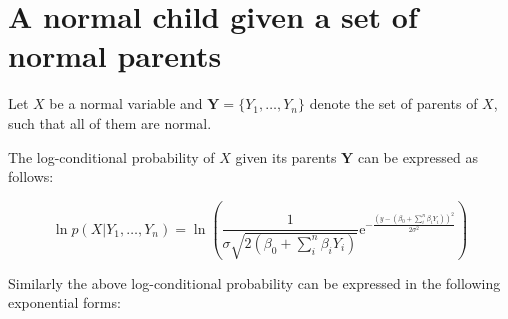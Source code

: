 \documentclass[11pt, oneside]{article}   	%
\newcommand{\me}{\mathrm{e}}
\numberwithin{figure}{section}
\numberwithin{equation}{section}
\numberwithin{table}{section}
\begin{document}
\newpage
\section{A normal child given a set of normal parents}

Let $X$ be a normal variable and $ \mathbf{Y} = \{Y_1,\ldots,Y_n\}$ denote the set of parents of $X$, such that all of them are normal. 

The log-conditional probability of $X$ given its parents $\mathbf{Y}$ can be expressed as follows:

$$ \ln p(X|Y_1,\ldots,Y_n) = \ln \left(\frac{1}{\sigma \sqrt{2(\beta_0+\sum_i^n \beta_i Y_i )}} \me^{-\frac{(y-(\beta_0+\sum_i^n \beta_i Y_i))^2}{2\sigma^2}} \right)$$


Similarly the above log-conditional probability can be expressed in the following exponential forms:
\end{document}
